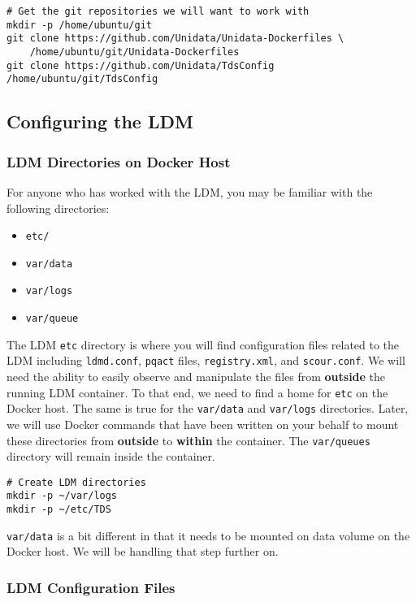\documentclass[11pt]{article}
\begin{document}
\begin{verbatim}
# Get the git repositories we will want to work with
mkdir -p /home/ubuntu/git
git clone https://github.com/Unidata/Unidata-Dockerfiles \
    /home/ubuntu/git/Unidata-Dockerfiles
git clone https://github.com/Unidata/TdsConfig /home/ubuntu/git/TdsConfig
\end{verbatim}

\subsection{Configuring the LDM}
\label{sec:orgheadline24}
\subsubsection{LDM Directories on Docker Host}
\label{sec:orgheadline16}

For anyone who has worked with the LDM, you may be familiar with the following directories:


\begin{itemize}
\item \texttt{etc/}
\item \texttt{var/data}
\item \texttt{var/logs}
\item \texttt{var/queue}
\end{itemize}


The LDM \texttt{etc} directory is where you will find configuration files related to the LDM including \texttt{ldmd.conf}, \texttt{pqact} files, \texttt{registry.xml}, and  \texttt{scour.conf}. We will need the ability to easily observe and manipulate the files from \textbf{outside} the running LDM container. To that end, we need to find a home for \texttt{etc} on the Docker host. The same is true for the \texttt{var/data} and \texttt{var/logs} directories. Later, we will use Docker commands that have been written on your behalf to mount these directories from \textbf{outside} to \textbf{within} the container. The \texttt{var/queues} directory will remain inside the container.

\begin{verbatim}
# Create LDM directories
mkdir -p ~/var/logs 
mkdir -p ~/etc/TDS
\end{verbatim}

\texttt{var/data} is a bit different in that it needs to be mounted on data volume on the Docker host. We will be handling that step further on.

\subsubsection{LDM Configuration Files}
\label{sec:orgheadline22}
\end{document}
